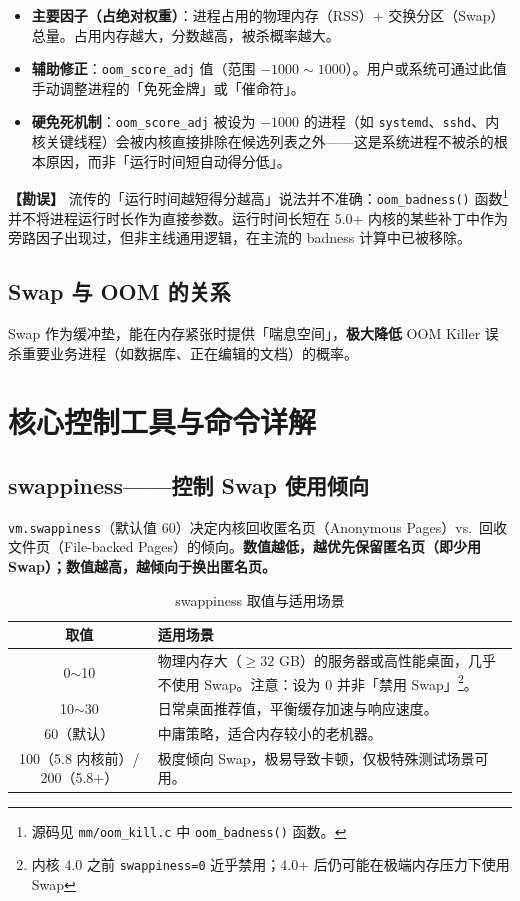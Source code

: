 \begin{itemize}[leftmargin=2cm]
	\item \textbf{主要因子（占绝对权重）}：进程占用的物理内存（RSS）+ 交换分区（Swap）总量。占用内存越大，分数越高，被杀概率越大。
	\item \textbf{辅助修正}：\texttt{oom\_score\_adj} 值（范围 $-1000\sim 1000$）。用户或系统可通过此值手动调整进程的「免死金牌」或「催命符」。
	\item \textbf{硬免死机制}：\texttt{oom\_score\_adj} 被设为 $-1000$ 的进程（如 \texttt{systemd}、\texttt{sshd}、内核关键线程）会被内核直接排除在候选列表之外——这是系统进程不被杀的根本原因，而非「运行时间短自动得分低」。
\end{itemize}

\textbf{【勘误】} 流传的「运行时间越短得分越高」说法并不准确：\texttt{oom\_badness()} 函数\footnote{源码见 \texttt{mm/oom\_kill.c} 中 \texttt{oom\_badness()} 函数。}并不将进程运行时长作为直接参数。运行时间长短在 5.0+ 内核的某些补丁中作为旁路因子出现过，但非主线通用逻辑，在主流的 badness 计算中已被移除。

\section{Swap 与 OOM 的关系}

Swap 作为缓冲垫，能在内存紧张时提供「喘息空间」，\textbf{极大降低} OOM Killer 误杀重要业务进程（如数据库、正在编辑的文档）的概率。


\chapter{核心控制工具与命令详解}

\section{swappiness——控制 Swap 使用倾向}

\texttt{vm.swappiness}（默认值 60）决定内核回收匿名页（Anonymous Pages）vs.\ 回收文件页（File-backed Pages）的倾向。\textbf{数值越低，越优先保留匿名页（即少用 Swap）；数值越高，越倾向于换出匿名页。}

\begin{table}[htbp]
\centering
\caption{swappiness 取值与适用场景}
\begin{tabular}{@{}c p{7cm}@{}}
\toprule
\textbf{取值} & \textbf{适用场景} \\
\midrule
0$\sim$10  & 物理内存大（$\ge 32$ GB）的服务器或高性能桌面，几乎不使用 Swap。注意：设为 0 并非「禁用 Swap」\footnote{内核 4.0 之前 \texttt{swappiness=0} 近乎禁用；4.0+ 后仍可能在极端内存压力下使用 Swap}。 \\
10$\sim$30 & 日常桌面推荐值，平衡缓存加速与响应速度。 \\
60（默认） & 中庸策略，适合内存较小的老机器。 \\
100（5.8 内核前）/ 200（5.8+） & 极度倾向 Swap，极易导致卡顿，仅极特殊测试场景可用。 \\
\bottomrule
\end{tabular}
\end{table}

